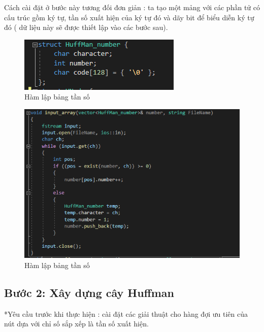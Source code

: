 \documentclass[14pt]{extreport}
\begin{document}
Cách cài đặt ở bước này tương đối đơn giản : ta tạo một mảng với các phần tử có cấu trúc gồm ký tự, tần số xuất hiện của ký tự đó và dãy bit để biểu diễn ký tự đó ( dữ liệu này sẽ được thiết lập vào các bước sau).
\begin{center}
    \begin{figure}[H]
    \begin{center}
     \includegraphics[scale=2.0]{Huffman_number.PNG}
    \end{center}
    \caption{Hàm lập bảng tần số}
    \label{refhinh1}
    \end{figure}
\end{center}

\begin{center}
    \begin{figure}[H]
    \begin{center}
     \includegraphics[scale=1.0]{input_array.PNG}
    \end{center}
    \caption{Hàm lập bảng tần số}
    \label{refhinh1}
    \end{figure}
\end{center}
\subsection{Bước 2: Xây dựng cây Huffman}
*Yêu cầu trước khi thực hiện : cài đặt các giải thuật cho hàng đợi ưu tiên của nút dựa với chỉ số sắp xếp là tần số xuất hiện.
\end{document}
